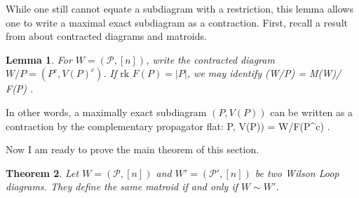 \documentclass[11pt]{article}
\newcommand{\rk}{\textrm{rk }}
\def\bas #1\eas{\begin{align*} #1 \end{align*}}
\newcommand{\cP}{\mathcal{P}}
\newtheorem{thm}{Theorem}[section]
\newtheorem{lem}[thm]{Lemma}
\theoremstyle{remark}
\theoremstyle{definition}
\begin{document}
While one still cannot equate a subdiagram with a restriction, this lemma allows one to write a maximal exact subdiagram as a contraction. First, recall a result from \cite{wilsonloops} about contracted diagrams and matroids.

\begin{lem}
For $W = (\cP, [n])$, write the contracted diagram $W/P = (P^c, V(P)^c)$. If $\rk F(P) = |P|$, we may identify \bas M(W/P) = M(W)/ F(P) \;. \eas
\end{lem}

In other words, a maximally exact subdiagram $(P, V(P))$  can be written as a contraction by the complementary propagator flat: \bas (P, V(P)) = W/F(P^c) \;.\eas

Now I am ready to prove the main theorem of this section.

\begin{thm}
Let $W= (\cP, [n])$ and $W'= (\cP', [n])$ be two Wilson Loop diagrams. They define the same matroid if and only if $W \sim W'$.
\end{thm}
\end{document}
